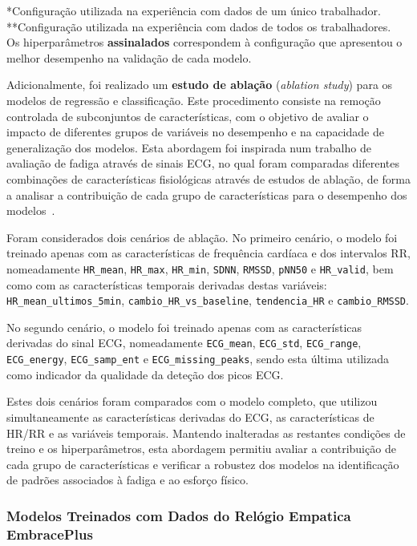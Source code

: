 \noindent
*Configuração utilizada na experiência com dados de um único trabalhador.\\
**Configuração utilizada na experiência com dados de todos os trabalhadores.\\
Os hiperparâmetros \textbf{assinalados} correspondem à configuração que apresentou o melhor desempenho na validação de cada modelo.

Adicionalmente, foi realizado um \textbf{estudo de ablação} (\textit{ablation study}) para os modelos de regressão e classificação. Este procedimento consiste na remoção controlada de subconjuntos de características, com o objetivo de avaliar o impacto de diferentes grupos de variáveis no desempenho e na capacidade de generalização dos modelos. Esta abordagem foi inspirada num trabalho de avaliação de fadiga através de sinais ECG, no qual foram comparadas diferentes combinações de características fisiológicas através de estudos de ablação, de forma a analisar a contribuição de cada grupo de características para o desempenho dos modelos~\cite{mental_fatigue_ablation2025}.

Foram considerados dois cenários de ablação. No primeiro cenário, o modelo foi treinado apenas com as características de frequência cardíaca e dos intervalos RR, nomeadamente \texttt{HR\_mean}, \texttt{HR\_max}, \texttt{HR\_min}, \texttt{SDNN}, \texttt{RMSSD}, \texttt{pNN50} e \texttt{HR\_valid}, bem como com as características temporais derivadas destas variáveis: \texttt{HR\_mean\_ultimos\_5min}, \texttt{cambio\_HR\_vs\_baseline}, \texttt{tendencia\_HR} e \texttt{cambio\_RMSSD}.

No segundo cenário, o modelo foi treinado apenas com as características derivadas do sinal ECG, nomeadamente \texttt{ECG\_mean}, \texttt{ECG\_std}, \texttt{ECG\_range}, \texttt{ECG\_energy}, \texttt{ECG\_samp\_ent} e \texttt{ECG\_missing\_peaks}, sendo esta última utilizada como indicador da qualidade da deteção dos picos ECG.

Estes dois cenários foram comparados com o modelo completo, que utilizou simultaneamente as características derivadas do ECG, as características de HR/RR e as variáveis temporais. Mantendo inalteradas as restantes condições de treino e os hiperparâmetros, esta abordagem permitiu avaliar a contribuição de cada grupo de características e verificar a robustez dos modelos na identificação de padrões associados à fadiga e ao esforço físico.

\subsubsection*{Modelos Treinados com Dados do Relógio Empatica EmbracePlus}

